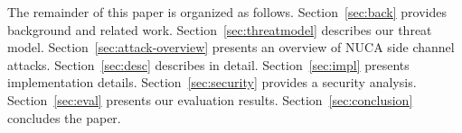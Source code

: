 The remainder of this paper is organized as follows.
Section~\ref{sec:back} provides background and related work.
Section~\ref{sec:threatmodel} describes our threat model.
Section~\ref{sec:attack-overview} presents an overview of NUCA side channel attacks.
Section~\ref{sec:desc} describes \scheme{} in detail.
Section~\ref{sec:impl} presents implementation details.
Section~\ref{sec:security} provides a security analysis.
Section~\ref{sec:eval} presents our evaluation results.
Section~\ref{sec:conclusion} concludes the paper.
